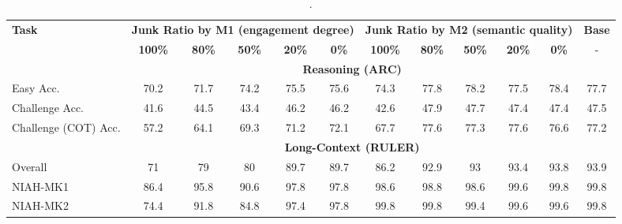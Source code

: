 \begin{table}[ht]
\centering
\scriptsize
\caption{\llama.}
\label{tab:benchmark_llama_full}
\setlength{\tabcolsep}{6pt}

\begin{tabular}{l|ccccc|ccccc|c}
\toprule
\multirow{2}{*}{\textbf{Task}}  & \multicolumn{5}{c|}{\textbf{Junk Ratio by M1 (engagement degree)}} & \multicolumn{5}{c|}{\textbf{Junk Ratio by M2 (semantic quality)}} & \textbf{Base} \\
 & \textbf{100\%} & \textbf{80\%} & \textbf{50\%} & \textbf{20\%} & \textbf{0\%} & \textbf{100\%} & \textbf{80\%} & \textbf{50\%} & \textbf{20\%} & \textbf{0\%} & - \\
\midrule
&\multicolumn{10}{c}{\textbf{Reasoning (ARC)}}\\
Easy Acc. & \cellcolor{myred!90} 70.2 & \cellcolor{myred!72} 71.7 & \cellcolor{myred!42} 74.2 & \cellcolor{myred!26} 75.5 & \cellcolor{myred!25} 75.6 & \cellcolor{myred!40} 74.3 & \cellcolor{royalblue!2} 77.8 & \cellcolor{royalblue!7} 78.2 & \cellcolor{myred!2} 77.5 & \cellcolor{royalblue!9} 78.4 & 77.7 \\
Challenge Acc. & \cellcolor{myred!90} 41.6 & \cellcolor{myred!46} 44.5 & \cellcolor{myred!63} 43.4 & \cellcolor{myred!20} 46.2 & \cellcolor{myred!21} 46.2 & \cellcolor{myred!76} 42.6 & \cellcolor{royalblue!5} 47.9 & \cellcolor{royalblue!3} 47.7 & \cellcolor{myred!1} 47.4 & \cellcolor{myred!3} 47.4 & 47.5 \\
Challenge (COT) Acc. & \cellcolor{myred!90} 57.2 & \cellcolor{myred!59} 64.1 & \cellcolor{myred!36} 69.3 & \cellcolor{myred!27} 71.2 & \cellcolor{myred!23} 72.1 & \cellcolor{myred!43} 67.7 & \cellcolor{royalblue!2} 77.6 & 77.3 & \cellcolor{royalblue!2} 77.6 & \cellcolor{myred!3} 76.6 & 77.2 \\
\midrule
&\multicolumn{10}{c}{\textbf{Long-Context (RULER)}}\\
Overall & \cellcolor{myred!90} 71 & \cellcolor{myred!59} 79 & \cellcolor{myred!55} 80 & \cellcolor{myred!17} 89.7 & \cellcolor{myred!17} 89.7 & \cellcolor{myred!30} 86.2 & \cellcolor{myred!4} 92.9 & \cellcolor{myred!4} 93 & \cellcolor{myred!2} 93.4 & 93.8 & 93.9 \\
NIAH-MK1 & \cellcolor{myred!90} 86.4 & \cellcolor{myred!27} 95.8 & \cellcolor{myred!62} 90.6 & \cellcolor{myred!13} 97.8 & \cellcolor{myred!13} 97.8 & \cellcolor{myred!8} 98.6 & \cellcolor{myred!7} 98.8 & \cellcolor{myred!8} 98.6 & \cellcolor{myred!1} 99.6 & 99.8 & 99.8 \\
NIAH-MK2 & \cellcolor{myred!90} 74.4 & \cellcolor{myred!28} 91.8 & \cellcolor{myred!53} 84.8 & \cellcolor{myred!9} 97.4 & \cellcolor{myred!7} 97.8 & 99.8 & 99.8 & \cellcolor{myred!1} 99.4 & \cellcolor{myred!1} 99.6 & \cellcolor{myred!1} 99.6 & 99.8 \\

\end{tabular}
\end{table}
